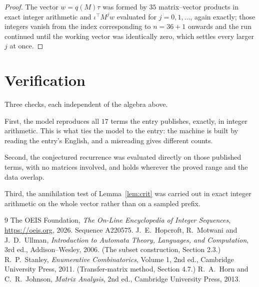 \documentclass[11pt,a4paper]{article}
\theoremstyle{plain}
\theoremstyle{definition}
\begin{document}
\begin{proof}
The vector $w=q(M)\tau$ was formed by $35$ matrix--vector products in exact integer
arithmetic and $\iota^{\!\top}M^{j}w$ evaluated for $j=0,1,\dots$, again exactly; those
integers vanish from the index corresponding to $n=36+1$ onwards and the run continued
until the working vector was identically zero, which settles every larger $j$ at once.
\end{proof}

\section{Verification}

Three checks, each independent of the algebra above.

First, the model reproduces all $17$ terms the entry publishes, exactly, in integer
arithmetic. This is what ties the model to the entry: the machine is built by reading the
entry's English, and a misreading gives different counts.

Second, the conjectured recurrence was evaluated directly on those published terms, with no
matrices involved, and holds wherever the proved range and the data overlap.

Third, the annihilation test of Lemma~\ref{lem:crit} was carried out in exact integer
arithmetic on the whole vector rather than on a sampled prefix.

\begin{thebibliography}{9}
 The OEIS Foundation, \emph{The On-Line Encyclopedia of Integer
Sequences}, \url{https://oeis.org}, 2026. Sequence A220575.
 J.~E.~Hopcroft, R.~Motwani and J.~D.~Ullman, \emph{Introduction to Automata
Theory, Languages, and Computation}, 3rd ed., Addison--Wesley, 2006. (The subset
construction, Section 2.3.)
 R.~P.~Stanley, \emph{Enumerative Combinatorics}, Volume 1, 2nd ed.,
Cambridge University Press, 2011. (Transfer-matrix method, Section 4.7.)
 R.~A.~Horn and C.~R.~Johnson, \emph{Matrix Analysis}, 2nd ed., Cambridge
University Press, 2013.
\end{thebibliography}
\end{document}
